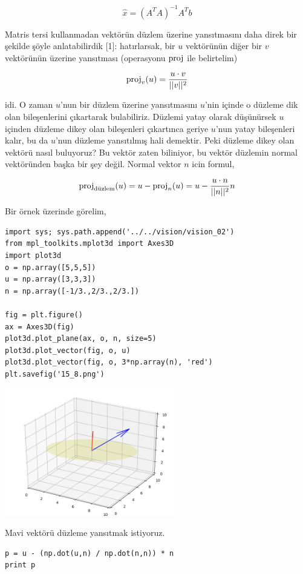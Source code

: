 \documentclass[12pt,fleqn]{article}\usepackage{../../common}
\begin{document}
$$ \hat{x} = (A^TA)^{-1}A^Tb $$

Matris tersi kullanmadan vektörün düzlem üzerine yansıtmasını daha direk
bir şekilde şöyle anlatabilirdik [1]: hatırlarsak, bir $u$ vektörünün diğer
bir $v$ vektörünün üzerine yansıtması (operasyonu $\operatorname{proj}$ ile belirtelim)

$$ \operatorname{proj}_v(u) = \frac{u \cdot v}{||v||^2} $$

idi. O zaman $u$'nun bir düzlem üzerine yansıtmasını $u$'nin içinde o
düzleme dik olan bileşenlerini çıkartarak bulabiliriz. Düzlemi yatay olarak
düşünürsek $u$ içinden düzleme dikey olan bileşenleri çıkartınca geriye
$u$'nun yatay bileşenleri kalır, bu da $u$'nun düzleme yansıtılmış hali
demektir. Peki düzleme dikey olan vektörü nasıl buluyoruz? Bu vektör zaten
biliniyor, bu vektör düzlemin normal vektöründen başka bir şey
değil. Normal vektor $n$ icin formul,

$$ \operatorname{proj}_{\textrm{düzlem}}(u) = u - \operatorname{proj}_{n}(u) = u - \frac{u \cdot n}{||n||^2} n $$

Bir örnek üzerinde görelim, 

\begin{verbatim}
import sys; sys.path.append('../../vision/vision_02')
from mpl_toolkits.mplot3d import Axes3D
import plot3d
o = np.array([5,5,5])
u = np.array([3,3,3])
n = np.array([-1/3.,2/3.,2/3.])

fig = plt.figure()
ax = Axes3D(fig)
plot3d.plot_plane(ax, o, n, size=5)
plot3d.plot_vector(fig, o, u)
plot3d.plot_vector(fig, o, 3*np.array(n), 'red')
plt.savefig('15_8.png')
\end{verbatim}

\includegraphics[width=20em]{15_8.png}

Mavi vektörü düzleme yansıtmak istiyoruz. 

\begin{verbatim}
p = u - (np.dot(u,n) / np.dot(n,n)) * n
print p
\end{verbatim}
\end{document}
